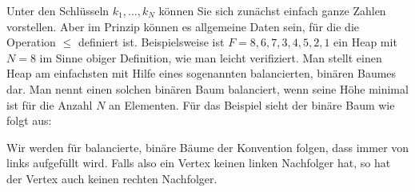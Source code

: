 \documentclass[tikz,12pt]{article}
\begin{document}
Unter den Schlüsseln $k_1, \ldots, k_N$ können Sie sich zunächst einfach ganze Zahlen vorstellen.
Aber im Prinzip können es allgemeine Daten sein, für die die Operation $\leq$ definiert ist.
Beispielsweise ist $F=8,6,7,3,4,5,2,1$ ein Heap mit $N=8$ im Sinne obiger Definition, wie man leicht verifiziert. 
Man stellt einen Heap am einfachsten mit Hilfe eines sogenannten balancierten, binären Baumes dar. 
Man nennt einen solchen binären Baum balanciert, wenn seine Höhe minimal ist für die Anzahl $N$ an Elementen.
Für das Beispiel sieht der binäre Baum wie folgt aus:
\begin{center}
\end{center}
Wir werden für balancierte, binäre Bäume der Konvention folgen, dass immer von links aufgefüllt wird.
Falls also ein Vertex keinen linken Nachfolger hat, so hat der Vertex auch keinen rechten Nachfolger.
\end{document}
